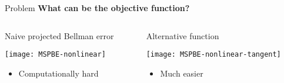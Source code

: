 \documentclass[11pt]{beamer}
\begin{document}
\begin{frame}{Problem}
	\textbf{What can be the objective function?}
	\vspace{1em}
	
	\begin{columns}[t]
		\begin{column}{0.5\textwidth}
			Naive projected Bellman error
			
			\texttt{[image: MSPBE-nonlinear]}
			
			\begin{itemize}
				\item Computationally hard
			\end{itemize}
		\end{column}
		\pause
		\begin{column}{0.5\textwidth}
			Alternative function
			
			\texttt{[image: MSPBE-nonlinear-tangent]}
			
			\begin{itemize}
				\item Much easier
			\end{itemize}
		\end{column}
	\end{columns}
\end{frame}
\end{document}

